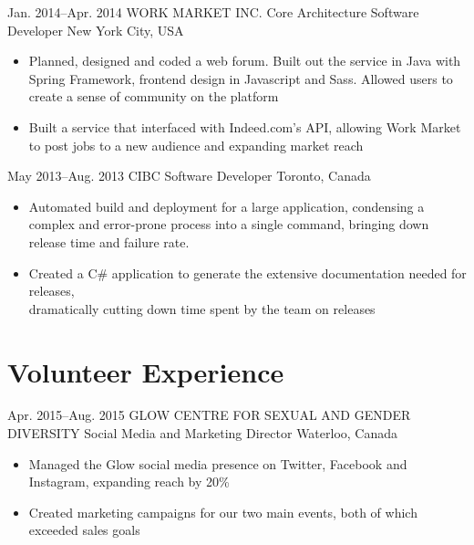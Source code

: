 \documentclass{resume-class}
\begin{document}
\begin{sectionlist}
	\entry
	{Jan. 2014--Apr. 2014}
	{WORK MARKET INC.}
	{Core Architecture Software Developer}
	{New York City, USA}
	{
		\begin{itemize}
		    \setlength{\itemsep}{0.2em}
			\item Planned, designed and coded a web forum. Built out the service in Java with Spring Framework, frontend design in Javascript and Sass. Allowed users to create a sense of community on the platform
			\item Built a service that interfaced with Indeed.com's API, allowing Work Market to post jobs to a new audience and expanding market reach
		\end{itemize}
	}
	
	\entry
	{May 2013--Aug. 2013}
	{CIBC}
	{Software Developer}
	 {Toronto, Canada} 
	{
		\begin{itemize}
		    \setlength{\itemsep}{0.2em}
			\item Automated build and deployment for a large application, condensing a complex and error-prone process into a single command, bringing down release time and failure rate. 
			\item Created a C\# application to generate the extensive documentation needed for releases,\\dramatically cutting down time spent by the team on releases
		\end{itemize}
	}
	
\end{sectionlist}



\vspace{-2.5\parskip}
\section{Volunteer Experience}


\begin{sectionlist}
	
	\entry
	{Apr. 2015--Aug. 2015}
	{GLOW CENTRE FOR SEXUAL AND GENDER DIVERSITY}
	{Social Media and Marketing Director}
	{Waterloo, Canada}
	{
		\begin{itemize}
		    \setlength{\itemsep}{0.2em}
			\item Managed the Glow social media presence on Twitter, Facebook and Instagram, expanding reach by 20\%
			\item Created marketing campaigns for our two main events, both of which exceeded sales goals
		\end{itemize}
	}

\end{sectionlist}
\end{document}
